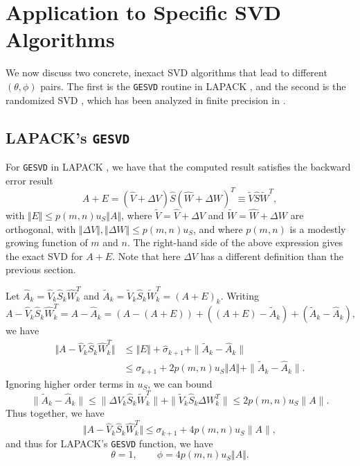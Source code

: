 \documentclass[12pt, a4paper]{article}
\newcommand{\What}{\widehat{W}}
\newcommand{\Shat}{\widehat{S}}
\newcommand{\Vhat}{\widehat{V}}
\theoremstyle{remark}
\begin{document}
\section{Application to Specific SVD Algorithms}
\label{sec:specSVD}

We now discuss two concrete, inexact SVD algorithms that lead to different $(\theta,\phi)$ pairs. The first is the \texttt{GESVD} routine in LAPACK \cite{anderson1999lapack}, and the second is the randomized SVD \cite{halko2011finding}, which has been analyzed in finite precision in \cite{connolly2022randomized}.

\subsection{LAPACK's \texttt{GESVD}}
\hspace{5mm}For \texttt{GESVD} in LAPACK \cite{anderson1999lapack}, we have that the computed result satisfies the backward error result
\[
A+E = (\Vhat+\Delta V) \Shat (\What+\Delta W)^T \equiv \widetilde{V}\Shat \widetilde{W}^T,
\]
with $\Vert E\Vert \leq p(m,n)u_S\Vert A\Vert$, where $\widetilde{V} = \Vhat + \Delta V$ and $\widetilde{W}=\What + \Delta W$ are orthogonal, with $\Vert \Delta V\Vert, \Vert \Delta W \Vert \leq p(m,n)u_S$, and where $p(m,n)$ is a modestly growing function of $m$ and $n$. The right-hand side of the above expression gives the exact SVD for $A+E$. Note that here $\Delta V$ has a different definition than the previous section. 

Let $\widehat{A}_k = \Vhat_k \Shat_k \What_k^T$ and $\widetilde{A}_k = \widetilde{V}_k \Shat_k \widetilde{W}_k^T = (A+E)_k$.
%
Writing
\[
A-\Vhat_k\Shat_k\What_k^T = A - \widehat{A}_k = (A - (A+E)) + ((A+E)-\widetilde{A}_k) + (\widetilde{A}_k - \widehat{A}_k),
\]
we have
\begin{align*}
\Vert A- \Vhat_k\Shat_k\What_k^T\Vert &\leq \Vert E \Vert +  \hat\sigma_{k+1} + \|\widetilde{A}_k - \widehat{A}_k\| \\
&\leq \sigma_{k+1} + 2p(m,n)u_S\Vert A \Vert + \|\widetilde{A}_k - \widehat{A}_k\| . 
\end{align*}
Ignoring higher order terms in $u_S$, we can bound 
\[
\|\widetilde{A}_k - \widehat{A}_k \| \leq \|\Delta V_k \Shat_k \widetilde{W}_k^T\| + \|\widetilde{V}_k \Shat_k \Delta W_k^T\| \leq 2p(m,n)u_S \|A\|.
\]
Thus together, we have
\[
\Vert A- \Vhat_k\Shat_k\What_k^T\Vert \leq \sigma_{k+1} + 4p(m,n)u_S\|A\|,
\]
and thus for LAPACK's \texttt{GESVD} function, we have
\begin{equation}
    \theta = 1, \qquad \phi = 4p(m,n)u_S\Vert A \Vert.
    \label{eq:thetaphigesvd}
\end{equation}
\end{document}

